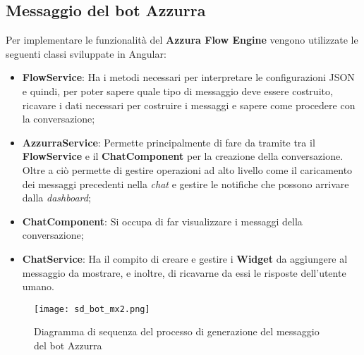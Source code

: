 \subsection{Messaggio del bot Azzurra}
Per implementare le funzionalità del \textbf{Azzura Flow Engine} vengono utilizzate le seguenti classi sviluppate in Angular:
\begin{itemize}
	\item \textbf{FlowService}: Ha i metodi necessari per interpretare le configurazioni JSON e quindi, per poter sapere quale tipo di messaggio deve essere costruito, ricavare i dati necessari per costruire i messaggi e sapere come procedere con la conversazione;
	\item \textbf{AzzurraService}: Permette principalmente di fare da tramite tra il \textbf{FlowService} e il \textbf{ChatComponent} per la creazione della conversazione. Oltre a ciò permette di gestire operazioni ad alto livello come il caricamento dei messaggi precedenti nella \emph{chat} e gestire le notifiche che possono arrivare dalla \emph{dashboard};
	\item \textbf{ChatComponent}: Si occupa di far visualizzare i messaggi della conversazione;
	\item \textbf{ChatService}: Ha il compito di creare e gestire i \textbf{Widget} da aggiungere al messaggio da mostrare, e inoltre, di ricavarne da essi le risposte dell'utente umano.
\end{itemize}

\begin{figure}[htbp]
	\centering
	\texttt{[image: sd\_bot\_mx2.png]}
	\caption{Diagramma di sequenza del processo di generazione del messaggio del bot Azzurra}\label{fig:mxBot}
\end{figure}

